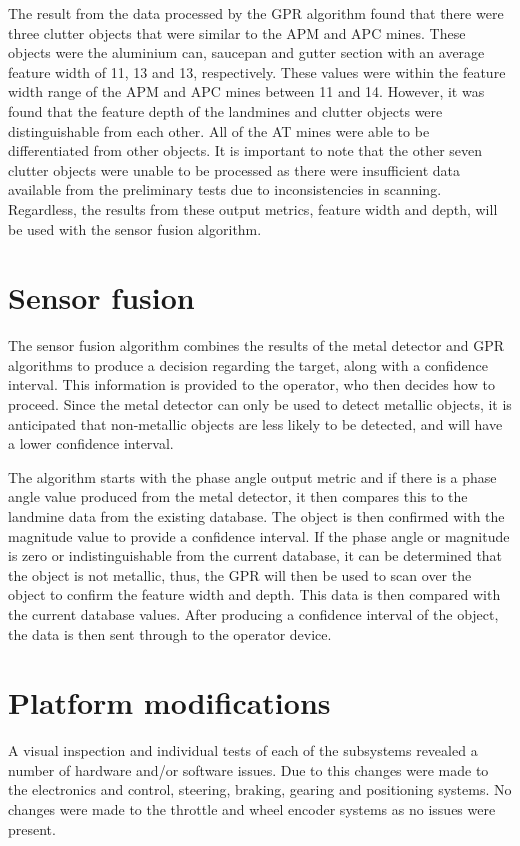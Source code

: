 \documentclass[main.tex]{subfiles}
\begin{document}
The result from the data processed by the GPR algorithm found that there were three clutter objects that were similar to the APM and APC mines. These objects were the aluminium can, saucepan and gutter section with an average feature width of 11, 13 and 13, respectively. These values were within the feature width range of the APM and APC mines between 11 and 14. However, it was found that the feature depth of the landmines and clutter objects were distinguishable from each other. All of the AT mines were able to be differentiated from other objects. It is important to note that the other seven clutter objects were unable to be processed as there were insufficient data available from the preliminary tests due to inconsistencies in scanning. Regardless, the results from these output metrics, feature width and depth, will be used with the sensor fusion algorithm. 

\section{Sensor fusion}
The sensor fusion algorithm combines the results of the metal detector and GPR algorithms to produce a decision regarding the target, along with a confidence interval. This information is provided to the operator, who then decides how to proceed. Since the metal detector can only be used to detect metallic objects, it is anticipated that non-metallic objects are less likely to be detected, and will have a lower confidence interval. 

The algorithm starts with the phase angle output metric and if there is a phase angle value produced from the metal detector, it then compares this to the landmine data from the existing database. The object is then confirmed with the magnitude value to provide a confidence interval. If the phase angle or magnitude is zero or indistinguishable from the current database, it can be determined that the object is not metallic, thus, the GPR will then be used to scan over the object to confirm the feature width and depth. This data is then compared with the current database values. After producing a confidence interval of the object, the data is then sent through to the operator device.  

\section{Platform modifications}
A visual inspection and individual tests of each of the subsystems revealed a number of hardware and/or software issues. Due to this changes were made to the electronics and control, steering, braking, gearing and positioning systems. No changes were made to the throttle and wheel encoder systems as no issues were present.
\end{document}

